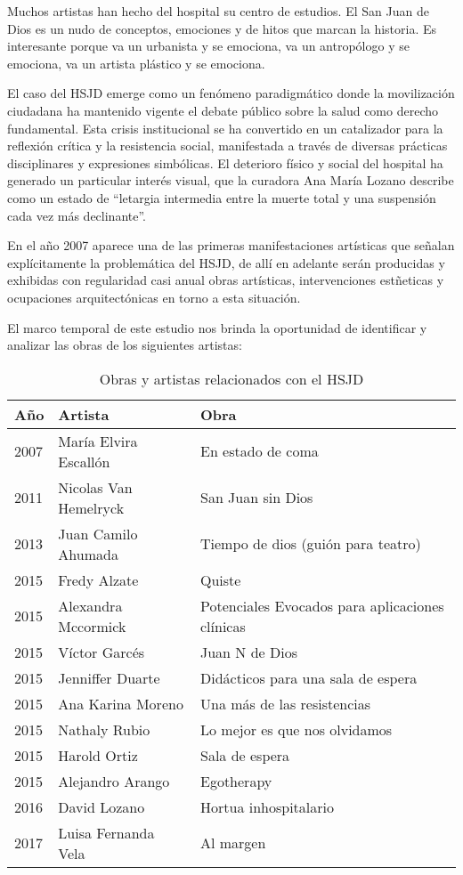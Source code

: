 Muchos artistas han hecho del hospital su centro de estudios. El San Juan de Dios es un nudo de conceptos, emociones y de hitos que marcan la historia. Es interesante porque va un urbanista y se emociona, va un antropólogo y se emociona, va un artista plástico y se emociona.

El caso del HSJD emerge como un fenómeno paradigmático donde la movilización ciudadana ha mantenido vigente el debate público sobre la salud como derecho fundamental. Esta crisis institucional se ha convertido en un catalizador para la reflexión crítica y la resistencia social, manifestada a través de diversas prácticas disciplinares y expresiones simbólicas. El deterioro físico y social del hospital ha generado un particular interés visual, que la curadora Ana María Lozano describe como un estado de ``letargia intermedia entre la muerte total y una suspensión cada vez más declinante''.

En el año 2007 aparece una de las primeras manifestaciones artísticas que señalan explícitamente la problemática del HSJD, de allí en adelante serán producidas y exhibidas con regularidad casi anual obras artísticas, intervenciones estñeticas y ocupaciones arquitectónicas en torno a esta situación.

El marco temporal de este estudio nos brinda la oportunidad de identificar y analizar las obras de los siguientes artistas:

\begin{table}[h!]
\centering
\begin{tabular}{|l|l|l|}
\hline
\textbf{Año} & \textbf{Artista} & \textbf{Obra} \\ \hline
2007 & María Elvira Escallón & En estado de coma \\ \hline
2011 & Nicolas Van Hemelryck & San Juan sin Dios \\ \hline
2013 & Juan Camilo Ahumada & Tiempo de dios (guión para teatro) \\ \hline
2015 & Fredy Alzate & Quiste \\ \hline
2015 & Alexandra Mccormick & Potenciales Evocados para aplicaciones clínicas \\ \hline
2015 & Víctor Garcés & Juan N de Dios \\ \hline
2015 & Jenniffer Duarte & Didácticos para una sala de espera \\ \hline
2015 & Ana Karina Moreno & Una más de las resistencias \\ \hline
2015 & Nathaly Rubio & Lo mejor es que nos olvidamos \\ \hline
2015 & Harold Ortiz & Sala de espera \\ \hline
2015 & Alejandro Arango & Egotherapy \\ \hline
2016 & David Lozano & Hortua inhospitalario \\ \hline
2017 & Luisa Fernanda Vela & Al margen \\ \hline
\end{tabular}
\caption{Obras y artistas relacionados con el HSJD}
\label{tabla:obras_artistas}
\end{table}

